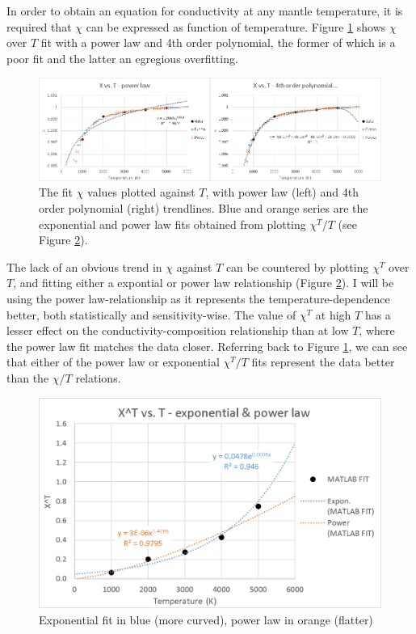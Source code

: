 In order to obtain an equation for conductivity at any mantle temperature, it is required that $\chi$ can be expressed as function of temperature. Figure \ref{fig:draft_xt} shows $\chi$ over $T$ fit with a power law and 4th order polynomial, the former of which is a poor fit and the latter an egregious overfitting. 

\begin{figure}[h]
  \includegraphics[width=\linewidth]{Figures/draft_XT.png}
  \caption{The fit $\chi$ values plotted against $T$, with power law (left) and 4th order polynomial (right) trendlines. Blue and orange series are the exponential and power law fits obtained from plotting $\chi^T/T$ (see Figure \ref{fig:draft_xtt}).}
  \label{fig:draft_xt}
\end{figure}

The lack of an obvious trend in $\chi$ against $T$ can be countered by plotting $\chi^T$ over $T$, and fitting either a expontial or power law relationship (Figure \ref{fig:draft_xtt}). I will be using the power law-relationship as it represents the temperature-dependence better, both statistically and sensitivity-wise. The value of $\chi^T$ at high $T$ has a lesser effect on the conductivity-composition relationship than at low $T$, where the power law fit matches the data closer. Referring back to Figure \ref{fig:draft_xt}, we can see that either of the power law or exponential $\chi^T/T$ fits represent the data better than the $\chi/T$ relations.\\ 

\begin{figure}[h]
  \includegraphics[width=\linewidth]{Figures/draft_XTT.png}
  \caption{Exponential fit in blue (more curved), power law in orange (flatter)}
  \label{fig:draft_xtt}
\end{figure}




